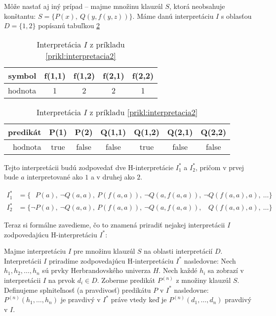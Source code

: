 \begin{priklad}
    \label{prikl:interpretacia2}
    Môže nastať aj iný prípad -- majme množinu klauzúl $S$, ktorá neobsahuje
    konštantu: $S=\{P(x),\ Q(y,f(y,z)) \}$.
    Máme danú interpretáciu $I$ s oblasťou $D=\{1,2\}$ popísanú
    tabuľkou \ref{tab:prikl-interpretacia2}

    \begin{table}[h]
        \centering
        \begin{tabular}{|r||c|c|c|c|}
            \hline
            symbol & f(1,1) & f(1,2) & f(2,1) & f(2,2) \\
            \hline
            hodnota  & 1 & 2 & 2 & 1 \\
            \hline
        \end{tabular}
        
        \medskip
        \begin{tabular}{|r||c|c|c|c|c|c|}
            \hline
            predikát & P(1) & P(2) & Q(1,1) & Q(1,2) & Q(2,1) & Q(2,2) \\
            \hline
            hodnota & true & false & false & true & false & false \\
            \hline
        \end{tabular}
        \caption{Interpretácia $I$ z príkladu
          \ref{prikl:interpretacia2}}
        \label{tab:prikl-interpretacia2}
    \end{table}
   
    Tejto interpretácii budú zodpovedať dve H-interpretácie
    $I_1^*$ a $I_2^*$, pričom v prvej bude $a$ interpretované ako $1$ 
    a v druhej ako $2$.

    \newcommand{\phn}{\phantom{\neg}}
    \begin{align*}
        I_1^* &= \{ \phn P(a),\ \neg Q(a,a),\ P(f(a,a)),\ \neg Q(a,f(a,a)),\
            \neg Q(f(a,a),a),\ \dots \} \\
        I_2^* &= \{ \neg P(a),\ \neg Q(a,a),\ P(f(a,a)),\ \neg Q(a,f(a,a)),\
            \phn Q(f(a,a),a),\ \dots \}
    \end{align*}
    \def\phn{\undefined}
\end{priklad}

Teraz si formálne zavedieme, čo to znamená priradiť nejakej interpretácii $I$
zodpovedajúcu H-interpretáciu $I^*$:

\begin{definicia}
    Majme interpretáciu $I$ pre množinu klauzúl $S$ na oblasti
    interpretácií $D$. Interpretácii $I$ priradíme zodpovedajúcu
    H-interpretáciu $I^*$ nasledovne:
    Nech $h_1, h_2, \ldots, h_n$ sú prvky Herbrandovského univerza
    $H$.
    Nech každé $h_i$ sa zobrazí v interpretácii $I$ na prvok
    $d_i \in D$.
    Zoberme predikát $P^{(n)}$ z množiny klauzúl $S$.
    Definujeme splniteľnosť (a pravdivosť) predikátu $P$ v $I^*$
    nasledovne:
    $P^{(n)}(h_1,\dots,h_n)$ je pravdivý v $I^*$ práve vtedy keď je
    $P^{(n)}(d_1,\dots,d_n)$ pravdivý v $I$.
\end{definicia}

